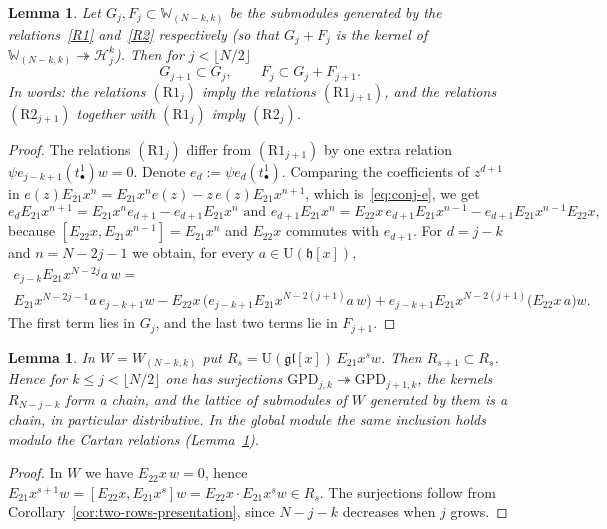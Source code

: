 \documentclass[11pt]{amsart}
\numberwithin{equation}{section}
\newtheorem{lemma}[equation]{Lemma}
\theoremstyle{definition}
\newcommand\cbl[1]{{\color{blue} #1}}
\newcommand{\gl}{\mathfrak{gl}}
\newcommand{\fh}{\mathfrak{h}}
\newcommand{\U}{\mathrm{U}}
\newcommand{\bW}{\mathbb{W}}          %
\newcommand{\GPD}{\mathrm{GPD}}         %
\begin{document}
	\begin{lemma}\label{lem:ChainsOfRelations}\label{lem:lift}
		Let $G_j,F_j\subset\bW_{(N-k,k)}$ be the submodules generated by the relations~\ref{R1} and~\ref{R2} respectively (so that $G_j+F_j$ is the kernel of $\bW_{(N-k,k)}\twoheadrightarrow\mathcal H_j^k$). Then for $j<\lfloor N/2\rfloor$
		\[
		G_{j+1}\subset G_j,\qquad F_j\subset G_j+F_{j+1}.
		\]
		In words: the relations $(\mathrm{R1}_j)$ imply the relations $(\mathrm{R1}_{j+1})$, and the relations $(\mathrm{R2}_{j+1})$ together with $(\mathrm{R1}_j)$ imply $(\mathrm{R2}_j)$.
	\end{lemma}
	\begin{proof}
		The relations $(\mathrm{R1}_j)$ differ from $(\mathrm{R1}_{j+1})$ by one extra relation $\psi e_{j-k+1}(t^1_{\bullet})w=0$.
		Denote $e_d:=\psi e_d(t^1_\bullet)$. 
		Comparing the coefficients of $z^{d+1}$ in $e(z)E_{21}x^{n}=E_{21}x^{n}e(z)-z\,e(z)E_{21}x^{n+1}$, which is~\eqref{eq:conj-e}, we get 
		$$e_d E_{21}x^{n+1}=E_{21}x^{n} e_{d+1} -  e_{d+1} E_{21}x^{n} \text{ and }
		e_{d+1}E_{21}x^{n}=E_{22}x\,e_{d+1}E_{21}x^{n-1}-e_{d+1}E_{21}x^{n-1}E_{22}x,$$ because $[E_{22}x,E_{21}x^{n-1}]=E_{21}x^n$ and $E_{22}x$ commutes with $e_{d+1}$. For $d=j-k$ and $n=N-2j-1$ we obtain, for every $a\in\U(\fh[x])$,
		\begin{multline}\label{eq:lift}
			e_{j-k}E_{21}x^{N-2j}a\,w = \\ E_{21}x^{N-2j-1}a\,e_{j-k+1}w-E_{22}x\,\big(e_{j-k+1}E_{21}x^{N-2(j+1)}a\,w\big)+e_{j-k+1}E_{21}x^{N-2(j+1)}\big(E_{22}x\,a\big)w .
		\end{multline}
		The first term lies in $G_j$, and the last two terms lie in $F_{j+1}$.
	\end{proof}
	
	
	
	\begin{lemma}\label{lem:GPD-chain}
		In $W=W_{(N-k,k)}$ put $R_s=\U(\gl[x])\,E_{21}x^sw$. Then $R_{s+1}\subset R_s$. Hence for $k\le j<\lfloor N/2\rfloor$ one has surjections $\GPD_{j,k}\twoheadrightarrow\GPD_{j+1,k}$, the kernels $R_{N-j-k}$ form a chain, and the lattice of submodules of $W$ generated by them is a chain, in particular distributive. In the global module the same inclusion holds modulo the Cartan relations \cbl{(Lemma~\ref{lem:ChainsOfRelations})}.
	\end{lemma}
	\begin{proof}
		In $W$ we have $E_{22}x\,w=0$, hence $E_{21}x^{s+1}w=[E_{22}x,E_{21}x^s]w=E_{22}x\cdot E_{21}x^sw\in R_s$. The surjections follow from Corollary~\ref{cor:two-rows-presentation}, since $N-j-k$ decreases when $j$ grows.
	\end{proof}
	
\end{document}
